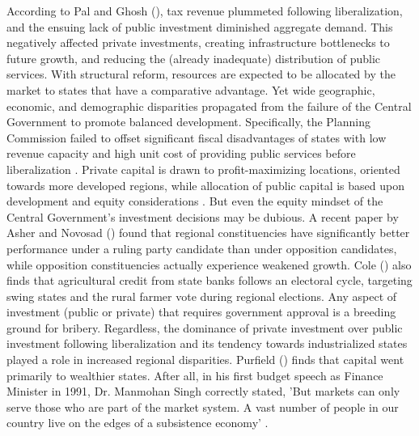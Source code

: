 \documentclass[a4paper, 11pt]{article}
\begin{document}
According to Pal and Ghosh (\citeyear{pal_inequality_2007}), tax revenue plummeted following liberalization, and the ensuing lack of public investment diminished aggregate demand.  This negatively affected private investments, creating infrastructure bottlenecks to future growth, and reducing the (already inadequate) distribution of public services.  With structural reform, resources are expected to be allocated by the market to states that have a comparative advantage.  Yet wide geographic, economic, and demographic disparities propagated from the failure of the Central Government to promote balanced development.  Specifically, the Planning Commission failed to offset significant fiscal disadvantages of states with low revenue capacity and high unit cost of providing public services before liberalization \citep{kalirajan_fiscal_2012}.  Private capital is drawn to profit-maximizing locations, oriented towards more developed regions, while allocation of public capital is based upon development and equity considerations \citep{lall_unu-wider_2015}.  But even the equity mindset of the Central Government’s investment decisions may be dubious.  A recent paper by Asher and Novosad (\citeyear{asher_politics_2013}) found that regional constituencies have significantly better performance under a ruling party candidate than under opposition candidates, while opposition constituencies actually experience weakened growth.  Cole (\citeyear{cole_fixing_2009}) also finds that agricultural credit from state banks follows an electoral cycle, targeting swing states and the rural farmer vote during regional elections.  Any aspect of investment (public or private) that requires government approval is a breeding ground for bribery.  Regardless, the dominance of private investment over public investment following liberalization and its tendency towards industrialized states played a role in increased regional disparities.  Purfield (\citeyear{purfield_mind_2006}) finds that capital went primarily to wealthier states.  After all, in his first budget speech as Finance Minister in 1991, Dr. Manmohan Singh correctly stated, 'But markets can only serve those who are part of the market system.  A vast number of people in our country live on the edges of a subsistence economy' \citep{singh1991budget}. \par
\end{document}
